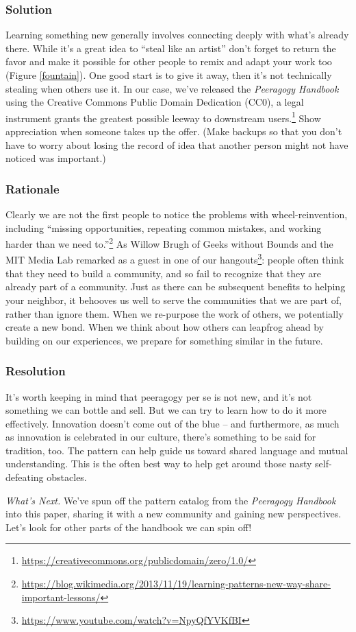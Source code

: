 \subsubsection*{Solution} Learning something new generally involves connecting deeply with what's already there.  While it's a great idea to ``steal like an artist'' don't forget to return the favor and make it possible for other people to remix and adapt your work too (Figure \ref{fountain}).  One good start is to give it away, then it's not technically stealing when others use it.
In our case, we've released the \emph{Peeragogy Handbook} using the Creative Commons Public Domain Dedication (CC0), a legal instrument grants the greatest possible leeway to downstream users.\footnote{\url{https://creativecommons.org/publicdomain/zero/1.0/}}  Show appreciation when someone takes up the offer.  (Make backups so that you don't have to worry about losing the record of idea that another person might not have noticed was important.)

\subsubsection*{Rationale} 
Clearly we are not the first people to notice the problems with wheel-reinvention, including ``missing opportunities, repeating common mistakes, and working harder than we need to.''\footnote{\url{https://blog.wikimedia.org/2013/11/19/learning-patterns-new-way-share-important-lessons/}}  As Willow Brugh of Geeks without Bounds and the MIT Media Lab remarked as a guest in one of our hangouts\footnote{\url{https://www.youtube.com/watch?v=NpyQfYVKfBI}}: people often think that they need to build a community, and so fail to recognize that they are already part of a community.  Just as there can be subsequent benefits to helping your neighbor, it behooves us well to serve the communities that we are part of, rather than ignore them.   When we re-purpose the work of others, we potentially create a new bond.   When we think about how others can leapfrog ahead by building on our experiences, we prepare for something similar in the future.

\subsubsection*{Resolution}   It's worth keeping in mind that peeragogy per se is not new, and it's not something we can bottle and sell.  But we can try to learn how to do it more effectively.  Innovation doesn't come out of the blue -- and furthermore, as much as innovation is celebrated in our culture, there's something to be said for tradition, too.   The pattern  can help guide us toward shared language and mutual understanding.  This is the often best way to help get around those nasty self-defeating obstacles.

\begin{framed}
\emph{What's Next.}
We've spun off the pattern catalog from the \emph{Peeragogy Handbook} into this paper, sharing it with a new community and gaining new perspectives.  Let's look for other parts of the handbook we can spin off!
\end{framed}

\endgroup

    
    
